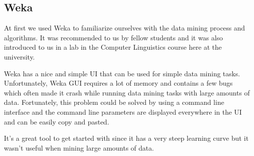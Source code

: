 \subsection{Weka} %
\label{sub:Weka}

At first we used Weka to familiarize ourselves with the data mining process and algorithms. It was recommended to us by fellow students and it was also introduced to us in a lab in the Computer Linguistics course here at the university.

Weka has a nice and simple UI that can be used for simple data mining tasks. Unfortunately, Weka GUI requires a lot of memory and contains a few bugs which often made it crash while running data mining tasks with large amounts of data. Fortunately, this problem could be solved by using a command line interface and the command line parameters are displayed everywhere in the UI and can be easily copy and pasted.

It's a great tool to get started with since it has a very steep learning curve but it wasn't useful when mining large amounts of data.

